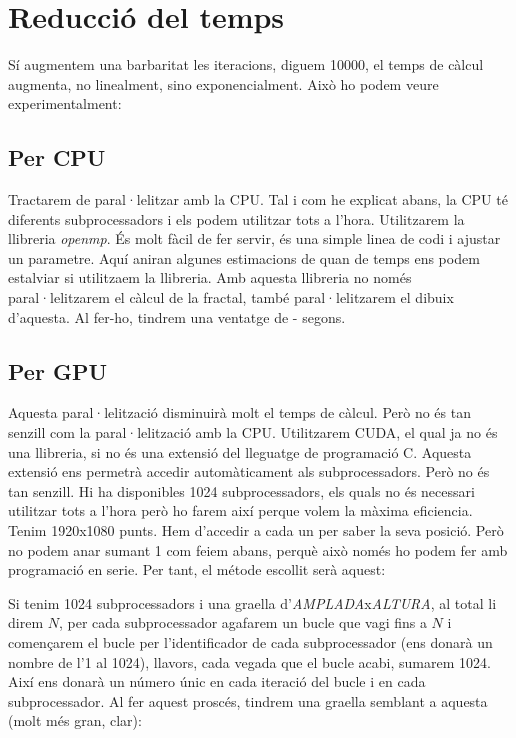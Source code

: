 \section{Reducció del temps}
Sí augmentem una barbaritat les iteracions, diguem 10000, el temps de càlcul augmenta, no linealment, sino exponencialment. \n
Això ho podem veure experimentalment:

\subsection{Per CPU}
Tractarem de paral·lelitzar amb la CPU. Tal i com he explicat abans, la CPU té diferents subprocessadors i els podem utilitzar tots a l'hora. \n
Utilitzarem la llibreria \emph{openmp}. És molt fàcil de fer servir, és una simple linea de codi i ajustar un parametre. \n
Aquí aniran algunes estimacions de quan de temps ens podem estalviar si utilitzaem la llibreria. \n
Amb aquesta llibreria no només paral·lelitzarem el càlcul de la fractal, també paral·lelitzarem el dibuix d'aquesta. Al fer-ho, tindrem una ventatge de - segons.

\subsection{Per GPU}
Aquesta paral·lelització disminuirà molt el temps de càlcul. Però no és tan senzill com la paral·lelització amb la CPU. \n
Utilitzarem CUDA, el qual ja no és una llibreria, si no és una extensió del lleguatge de programació C. Aquesta extensió ens permetrà accedir automàticament als subprocessadors. \n
Però no és tan senzill. Hi ha disponibles 1024 subprocessadors, els quals no és necessari utilitzar tots a l'hora però ho farem així perque volem la màxima eficiencia. \n
Tenim 1920x1080 punts. Hem d'accedir a cada un per saber la seva posició. Però no podem anar sumant 1 com feiem abans, perquè això només ho podem fer amb programació en serie. Per tant, el métode escollit serà aquest:
\begin{center}
    Si tenim 1024 subprocessadors i una graella d'\emph{AMPLADA}x\emph{ALTURA}, al total li direm $N$, per cada subprocessador agafarem un bucle que vagi fins a $N$ i començarem el bucle per l'identificador de cada subprocessador (ens donarà un nombre de l'1 al 1024), llavors, cada vegada que el bucle acabi, sumarem 1024. Així ens donarà un número únic en cada iteració del bucle i en cada subprocessador. Al fer aquest proscés, tindrem una graella semblant a aquesta (molt més gran, clar):
\end{center}

